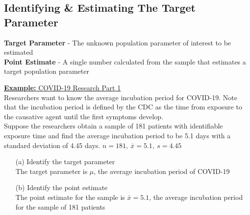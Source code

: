 \documentclass[a4paper]{article}
\let\bf\textbf
\begin{document}
\subsection{Identifying \& Estimating The Target Parameter}
\bf{Target Parameter} - The unknown population parameter of interest to be estimated
\vspace{1mm}\\
\bf{Point Estimate} - A single number calculated from the sample that estimates a target population parameter
\begin{shaded}
    \underline{\bf{Example:} COVID-19 Research Part 1}
    \vspace{1mm}\\
    Researchers want to know the average incubation period for COVID-19. Note that the incubation period is defined by the CDC as the time from exposure to the causative agent until the first symptoms develop.\vspace{1mm}\\
    Suppose the researchers obtain a sample of 181 patients with identifiable exposure time and find the average incubation period to be 5.1 days with a standard deviation of 4.45 days. $n = 181,\ \bar{x} = 5.1,\ s = 4.45$
    \begin{enumerate}
        \item[(a)] Identify the target parameter\\
        The target parameter is $\mu$, the average incubation period of COVID-19
        \item[(b)] Identify the point estimate\\
        The point estimate for the sample is $\bar{x} = 5.1$, the average incubation period for the sample of 181 patients
    \end{enumerate}
\end{shaded}
\end{document}
